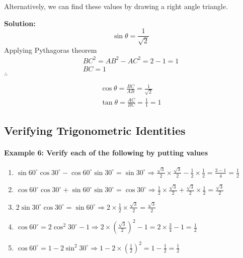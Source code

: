\documentclass{article}
\begin{document}
Alternatively, we can find these values by drawing a right angle triangle.

\begin{center}
\end{center}

{\scriptsize \textbf{Solution:}}
\[ \sin\theta = \frac{1}{\sqrt{2}} \]
Applying Pythagoras theorem
\[
  \begin{aligned}
    BC^{2} = AB^{2} - AC^{2} = 2 - 1 = 1 \\
    BC = 1
  \end{aligned}
\]
$\therefore$

\[
  \begin{aligned}
    \cos\theta = \frac{BC}{AB} = \frac{1}{\sqrt{2}} \\
    \tan\theta = \frac{AC}{BC} = \frac{1}{1} = 1
  \end{aligned}
\]

\subsection{Verifying Trigonometric Identities}
\paragraph{Example 6: Verify each of the following by putting values}

\begin{enumerate}[label=\alph*)]
  \item $\sin 60^{\circ} \cos 30^{\circ} - \cos 60^{\circ} \sin 30^{\circ} = \sin 30^{\circ} \Rightarrow \frac{\sqrt{3}}{2} \times \frac{\sqrt{3}}{2} - \frac{1}{2} \times \frac{1}{2} = \frac{3-1}{4}=\frac{1}{2}$
  \item $\cos 60^{\circ} \cos 30^{\circ} + \sin 60^{\circ} \sin 30^{\circ} = \cos 30^{\circ} \Rightarrow \frac{1}{2} \times \frac{\sqrt{3}}{2} + \frac{\sqrt{3}}{2} \times \frac{1}{2} = \frac{\sqrt{3}}{2}$
  \item $2 \sin 30^{\circ} \cos 30^{\circ} = \sin 60^{\circ} \Rightarrow 2 \times \frac{1}{2} \times \frac{\sqrt{3}}{2} = \frac{\sqrt{3}}{2}$
  \item $\cos 60^{\circ} = 2 \cos^{2} 30^{\circ} - 1 \Rightarrow 2 \times \left(\frac{\sqrt{3}}{2}\right)^{2} - 1 = 2 \times \frac{3}{4} - 1 = \frac{1}{2}$
  \item $\cos 60^{\circ} = 1 - 2 \sin^{2} 30^{\circ} \Rightarrow 1 - 2 \times \left(\frac{1}{2}\right)^{2} = 1 - \frac{1}{2} = \frac{1}{2}$
\end{enumerate}
\end{document}
